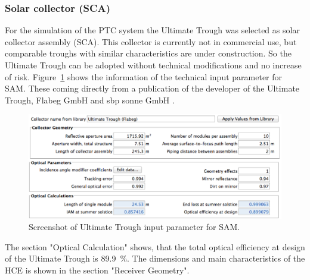 \documentclass[Master,MEE,english]{twbook}%
\begin{document}
\subsubsection{Solar collector (SCA)}
For the simulation of the PTC system the Ultimate Trough was selected as solar collector assembly (SCA). This collector is currently not in commercial use, but comparable troughs with similar characteristics are under construction. So the Ultimate Trough can be adopted  without technical modifications and no increase of risk. Figure~\ref{PTC_Ultimate_config} shows the information of the technical input parameter for SAM. These coming directly from a publication of the developer of the Ultimate Trough, Flabeg GmbH and sbp sonne GmbH \cite{Riffelmann2014}. 
\begin{figure}[bhtp]
\centering
\includegraphics[width=0.95\linewidth]{FIG/PTC_Ultimate_config}
\caption[Screenshot of Ultimate Trough input parameter for SAM.]{Screenshot of Ultimate Trough input parameter for SAM.}\label{PTC_Ultimate_config}
\end{figure}
The section "Optical Calculation" shows, that the total optical efficiency at design of the Ultimate Trough is 89.9~\%. The dimensions and main characteristics of the HCE is shown in the section "Receiver Geometry".
\end{document}
